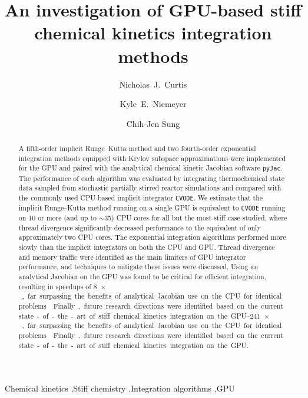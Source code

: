 \documentclass[preprint]{elsarticle}
\begin{document}
\begin{frontmatter}

\title{An investigation of GPU-based stiff chemical kinetics integration methods}

\author[uconn]{Nicholas~J.\ Curtis}
\author[osu]{Kyle~E.\ Niemeyer}
\author[uconn]{Chih-Jen Sung}

\address[uconn]{Department of Mechanical Engineering\\
  University of Connecticut, Storrs, CT, 06269, USA}
\address[osu]{School of Mechanical, Industrial, and Manufacturing Engineering\\
  Oregon State University, Corvallis, OR 97331, USA}
  

\begin{abstract}
A fifth-order implicit Runge--Kutta method and two fourth-order exponential integration methods equipped with Krylov subspace approximations were implemented for the GPU and paired with the analytical chemical kinetic Jacobian software \texttt{pyJac}.
The performance of each algorithm was evaluated by integrating thermochemical state data sampled from stochastic partially stirred reactor simulations and compared with the commonly used CPU-based implicit integrator \texttt{CVODE}.
We estimate that the implicit Runge--Kutta method running on a single GPU is equivalent to \texttt{CVODE} running on \num{10} or more (and up to $\sim$\num{35}) CPU cores for all but the most stiff case studied, where thread divergence significantly decreased performance to the equivalent of only approximately two CPU cores.
The exponential integration algorithms performed more slowly than the implicit integrators on both the CPU and GPU.
Thread divergence and memory traffic were identified as the main limiters of GPU integrator performance, and techniques to mitigate these issues were discussed.
Using an analytical Jacobian on the GPU was found to be critical for efficient integration, resulting in speedups of \SIrange{8}{241}{$\times$}, far surpassing the benefits of analytical Jacobian use on the CPU for identical problems.
Finally, future research directions were identified based on the current state-of-the-art of stiff chemical kinetics integration on the GPU.
\end{abstract}

\begin{keyword}
 Chemical kinetics \sep Stiff chemistry \sep Integration algorithms \sep GPU
\end{keyword}

\end{frontmatter}
\end{document}
